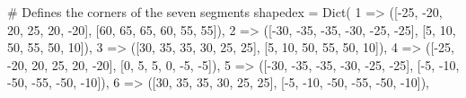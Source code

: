 \documentclass[
  letterpaper,
  DIV=11,
  numbers=noendperiod]{scrreprt}
\newenvironment{Shaded}{\begin{snugshade}}{\end{snugshade}}
\newcommand{\CommentTok}[1]{\textcolor[rgb]{0.37,0.37,0.37}{#1}}
\newcommand{\FloatTok}[1]{\textcolor[rgb]{0.68,0.00,0.00}{#1}}
\newcommand{\FunctionTok}[1]{\textcolor[rgb]{0.28,0.35,0.67}{#1}}
\newcommand{\NormalTok}[1]{\textcolor[rgb]{0.00,0.23,0.31}{#1}}
\newcommand{\OperatorTok}[1]{\textcolor[rgb]{0.37,0.37,0.37}{#1}}
\begin{document}
\begin{Shaded}
\begin{Highlighting}[]
\CommentTok{\# Defines the corners of the seven segments}
\NormalTok{shapedex }\OperatorTok{=} \FunctionTok{Dict}\NormalTok{(}
    \FloatTok{1} \OperatorTok{=\textgreater{}}\NormalTok{ ([}\OperatorTok{{-}}\FloatTok{25}\NormalTok{, }\OperatorTok{{-}}\FloatTok{20}\NormalTok{, }\FloatTok{20}\NormalTok{, }\FloatTok{25}\NormalTok{, }\FloatTok{20}\NormalTok{, }\OperatorTok{{-}}\FloatTok{20}\NormalTok{], [}\FloatTok{60}\NormalTok{, }\FloatTok{65}\NormalTok{, }\FloatTok{65}\NormalTok{, }\FloatTok{60}\NormalTok{, }\FloatTok{55}\NormalTok{, }\FloatTok{55}\NormalTok{]),}
    \FloatTok{2} \OperatorTok{=\textgreater{}}\NormalTok{ ([}\OperatorTok{{-}}\FloatTok{30}\NormalTok{, }\OperatorTok{{-}}\FloatTok{35}\NormalTok{, }\OperatorTok{{-}}\FloatTok{35}\NormalTok{, }\OperatorTok{{-}}\FloatTok{30}\NormalTok{, }\OperatorTok{{-}}\FloatTok{25}\NormalTok{, }\OperatorTok{{-}}\FloatTok{25}\NormalTok{], [}\FloatTok{5}\NormalTok{, }\FloatTok{10}\NormalTok{, }\FloatTok{50}\NormalTok{, }\FloatTok{55}\NormalTok{, }\FloatTok{50}\NormalTok{, }\FloatTok{10}\NormalTok{]),}
    \FloatTok{3} \OperatorTok{=\textgreater{}}\NormalTok{ ([}\FloatTok{30}\NormalTok{, }\FloatTok{35}\NormalTok{, }\FloatTok{35}\NormalTok{, }\FloatTok{30}\NormalTok{, }\FloatTok{25}\NormalTok{, }\FloatTok{25}\NormalTok{], [}\FloatTok{5}\NormalTok{, }\FloatTok{10}\NormalTok{, }\FloatTok{50}\NormalTok{, }\FloatTok{55}\NormalTok{, }\FloatTok{50}\NormalTok{, }\FloatTok{10}\NormalTok{]),}
    \FloatTok{4} \OperatorTok{=\textgreater{}}\NormalTok{ ([}\OperatorTok{{-}}\FloatTok{25}\NormalTok{, }\OperatorTok{{-}}\FloatTok{20}\NormalTok{, }\FloatTok{20}\NormalTok{, }\FloatTok{25}\NormalTok{, }\FloatTok{20}\NormalTok{, }\OperatorTok{{-}}\FloatTok{20}\NormalTok{], [}\FloatTok{0}\NormalTok{, }\FloatTok{5}\NormalTok{, }\FloatTok{5}\NormalTok{, }\FloatTok{0}\NormalTok{, }\OperatorTok{{-}}\FloatTok{5}\NormalTok{, }\OperatorTok{{-}}\FloatTok{5}\NormalTok{]),}
    \FloatTok{5} \OperatorTok{=\textgreater{}}\NormalTok{ ([}\OperatorTok{{-}}\FloatTok{30}\NormalTok{, }\OperatorTok{{-}}\FloatTok{35}\NormalTok{, }\OperatorTok{{-}}\FloatTok{35}\NormalTok{, }\OperatorTok{{-}}\FloatTok{30}\NormalTok{, }\OperatorTok{{-}}\FloatTok{25}\NormalTok{, }\OperatorTok{{-}}\FloatTok{25}\NormalTok{], [}\OperatorTok{{-}}\FloatTok{5}\NormalTok{, }\OperatorTok{{-}}\FloatTok{10}\NormalTok{, }\OperatorTok{{-}}\FloatTok{50}\NormalTok{, }\OperatorTok{{-}}\FloatTok{55}\NormalTok{, }\OperatorTok{{-}}\FloatTok{50}\NormalTok{, }\OperatorTok{{-}}\FloatTok{10}\NormalTok{]),}
    \FloatTok{6} \OperatorTok{=\textgreater{}}\NormalTok{ ([}\FloatTok{30}\NormalTok{, }\FloatTok{35}\NormalTok{, }\FloatTok{35}\NormalTok{, }\FloatTok{30}\NormalTok{, }\FloatTok{25}\NormalTok{, }\FloatTok{25}\NormalTok{], [}\OperatorTok{{-}}\FloatTok{5}\NormalTok{, }\OperatorTok{{-}}\FloatTok{10}\NormalTok{, }\OperatorTok{{-}}\FloatTok{50}\NormalTok{, }\OperatorTok{{-}}\FloatTok{55}\NormalTok{, }\OperatorTok{{-}}\FloatTok{50}\NormalTok{, }\OperatorTok{{-}}\FloatTok{10}\NormalTok{]),}

\end{Highlighting}
\end{Shaded}
\end{document}
